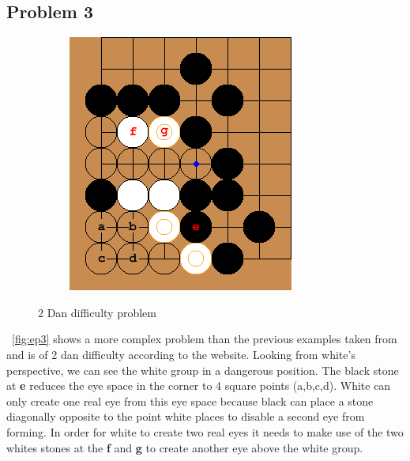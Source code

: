 \documentclass{l4proj}
\newcommand{\bo}[1]{\textbf{#1}}
\begin{document}
\subsection{Problem 3}

\begin{figure}[!ht]
\centering
\begin{subfigure}[b]{0.30\textwidth}
\includegraphics[width=\textwidth]{ep3/1.png}
\end{subfigure}
\caption{2 Dan difficulty problem}
\label{fig:ep3}
\end{figure}

~\autoref{fig:ep3} shows a more complex problem than the previous examples taken from \cite{GoProblems} and is of 2 dan difficulty according to the website. Looking from white’s perspective, we can see the white group in a dangerous position. The black stone at \bo{e} reduces the eye space in the corner to 4 square points (a,b,c,d). White can only create one real eye from this eye space because black can place a stone diagonally opposite to the point white places to disable a second eye from forming. In order for white to create two real eyes it needs to make use of the two whites stones at the \bo{f} and \bo{g} to create another eye above the white group.
\end{document}
